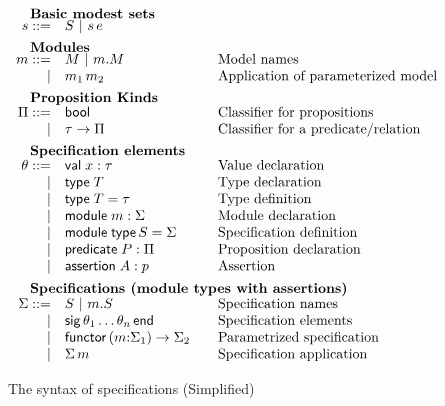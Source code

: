 \begin{figure}
\[\begin{array}{rl@{\qquad}l}
    \noalign{\textbf{Basic modest sets}}
    \os ::=
    & \oS \obar \oapp{\os}{\oe} & \\[5pt]

    \noalign{\textbf{Modules}}		
    \om ::= 
    & \oM  \obar \oselect{\om}{\oM}&\mbox{Model names}\\
    | & \oapp{\om_1}{\om_2}&\mbox{Application of parameterized model}\\[5pt]
    
    \noalign{\textbf{Proposition Kinds}}
    \opt ::=
    & \oProp & \mbox{Classifier for propositions}\\
    |& \oarrow{\oty}{\opt} & \mbox{Classifier for a predicate/relation}\\[5pt] 
    
    \noalign{\textbf{Specification elements}}
    \ote ::=
    & \ovalspec{\ox}{\oty}&\mbox{Value declaration}\\
    | & \otyspec{\oTY}&\mbox{Type declaration}\\
    | & \otydef{\oTY}{\oty}&\mbox{Type definition}\\
    | & \omodulespec{\om}{\omt}&\mbox{Module declaration}\\
    | & \osignatdef{\oMT}{\omt}&\mbox{Specification definition}\\
    | & \opropspec{\oP}{\opt}&\mbox{Proposition declaration}\\
    | & \oassertion{\oA}{\op}&\mbox{Assertion}\\[5pt]

    \noalign{\textbf{Specifications (module types with assertions)}}
    \omt ::= 
    & \oMT \obar \oselect{\om}{\oMT} & \mbox{Specification names}\\
    | & \osig{\ote_1 \ldots \ote_n} & \mbox{Specification elements}\\
    | & \ofunctor{\om}{\omt_1}{\omt_2} & \mbox{Parametrized specification}\\
    | & \oapp{\omt}{\om} & \mbox{Specification application}
  \end{array}
  \]
  \label{fig:output}
  \caption{The syntax of specifications (Simplified)}
\end{figure}


